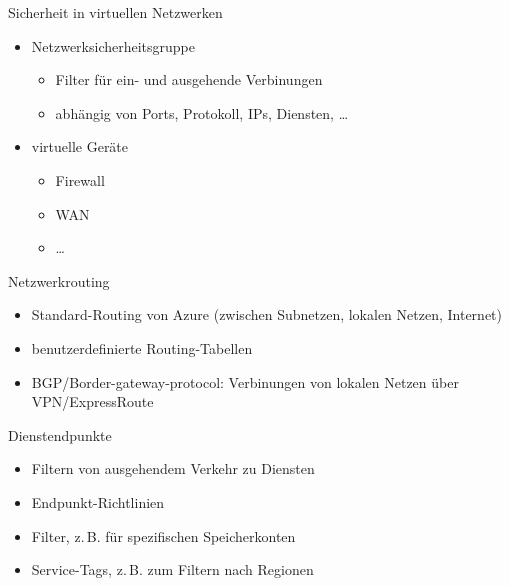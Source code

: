 \begin{flashcard}[]{Sicherheit in virtuellen Netzwerken}
  \begin{itemize}
    \item Netzwerksicherheitsgruppe
      \begin{itemize}
        \item Filter für ein- und ausgehende Verbinungen
        \item abhängig von Ports, Protokoll, IPs, Diensten, \ldots
      \end{itemize}
    \item virtuelle Geräte
      \begin{itemize}
        \item Firewall
        \item WAN
        \item \ldots
      \end{itemize}
  \end{itemize}
\end{flashcard}

\begin{flashcard}[]{Netzwerkrouting}
  \begin{itemize}
    \item Standard-Routing von Azure (zwischen Subnetzen, lokalen Netzen, Internet)
    \item benutzerdefinierte Routing-Tabellen
    \item BGP/Border-gateway-protocol: Verbinungen von lokalen Netzen über VPN/ExpressRoute
  \end{itemize}
\end{flashcard}

\begin{flashcard}[]{Dienstendpunkte}
  \begin{itemize}
    \item Filtern von ausgehendem Verkehr zu Diensten
    \item Endpunkt-Richtlinien
    \item Filter, z.\,B. für spezifischen Speicherkonten
    \item Service-Tags, z.\,B. zum Filtern nach Regionen
  \end{itemize}
\end{flashcard}

